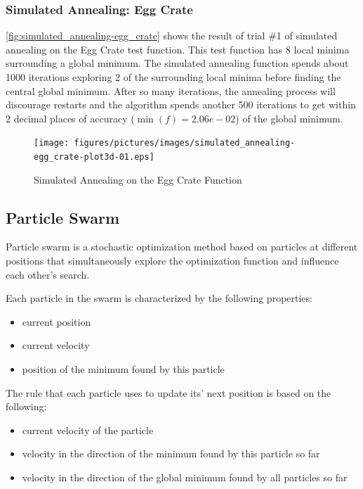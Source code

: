 \documentclass{vgtc}                          %
\begin{document}
\subsubsection{Simulated Annealing: Egg Crate}

\autoref{fig:simulated_annealing-egg_crate} shows the result of trial \#1 of simulated annealing on the Egg Crate test function. This test function has 8 local minima surrounding a global minimum.  The simulated annealing function spends about 1000 iterations exploring 2 of the surrounding local minima before finding the central global minimum.  After so many iterations, the annealing process will discourage restarts and the algorithm spends another 500 iterations to get within 2 decimal places of accuracy ($\min(f)=2.06e-02$) of the global minimum.

\begin{figure}[tb]
\centering
\texttt{[image: figures/pictures/images/simulated\_annealing-egg\_crate-plot3d-01.eps]}
\caption{Simulated Annealing on the Egg Crate Function}
\label{fig:simulated_annealing-egg_crate}
\end{figure}

\subsection{Particle Swarm}

Particle swarm \cite{Kennedy:2001} is a stochastic optimization method based on particles at different positions that simultaneously explore the optimization function and influence each other's search.

Each particle in the swarm is characterized by the following properties:
\begin{itemize}
\item current position
\item current velocity
\item position of the minimum found by this particle
\end{itemize}

The rule that each particle uses to update its' next position is based on the following:
\begin{itemize}
\item current velocity of the particle
\item velocity in the direction of the minimum found by this particle so far
\item velocity in the direction of the global minimum found by all particles so far
\end{itemize}
\end{document}
